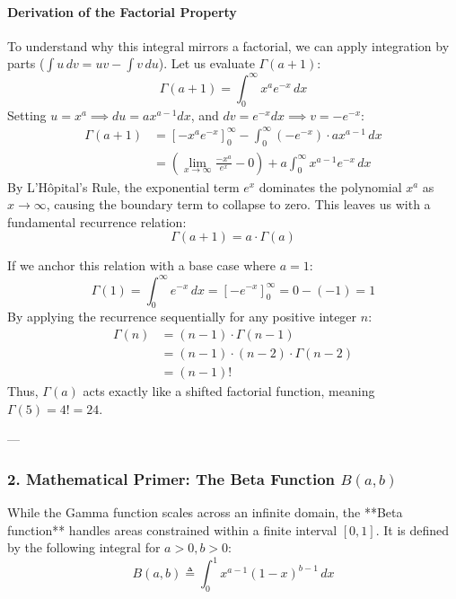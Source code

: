 \documentclass{article}
\begin{document}
\paragraph{Derivation of the Factorial Property}
To understand why this integral mirrors a factorial, we can apply integration by parts ($\int u \, dv = uv - \int v \, du$). Let us evaluate $\Gamma(a+1)$:
\begin{equation*}
\Gamma(a+1) = \int_{0}^{\infty} x^{a} e^{-x} \, dx
\end{equation*}
Setting $u = x^a \implies du = a x^{a-1} dx$, and $dv = e^{-x} dx \implies v = -e^{-x}$:
\begin{align*}
\Gamma(a+1) &= \left[ -x^a e^{-x} \right]_{0}^{\infty} - \int_{0}^{\infty} \left( -e^{-x} \right) \cdot a x^{a-1} \, dx \\
&= \left( \lim_{x \to \infty} \frac{-x^a}{e^x} - 0 \right) + a \int_{0}^{\infty} x^{a-1} e^{-x} \, dx
\end{align*}
By L'Hôpital's Rule, the exponential term $e^x$ dominates the polynomial $x^a$ as $x \to \infty$, causing the boundary term to collapse to zero. This leaves us with a fundamental recurrence relation:
\begin{equation*}
\Gamma(a+1) = a \cdot \Gamma(a)
\end{equation*}

If we anchor this relation with a base case where $a=1$:
\begin{equation*}
\Gamma(1) = \int_{0}^{\infty} e^{-x} \, dx = \left[ -e^{-x} \right]_{0}^{\infty} = 0 - (-1) = 1
\end{equation*}
By applying the recurrence sequentially for any positive integer $n$:
\begin{align*}
\Gamma(n) &= (n-1) \cdot \Gamma(n-1) \\
&= (n-1) \cdot (n-2) \cdot \Gamma(n-2) \\
&= (n-1)!
\end{align*}
Thus, $\Gamma(a)$ acts exactly like a shifted factorial function, meaning $\Gamma(5) = 4! = 24$.

---

\subsubsection*{2. Mathematical Primer: The Beta Function $B(a, b)$}

While the Gamma function scales across an infinite domain, the **Beta function** handles areas constrained within a finite interval $[0, 1]$. It is defined by the following integral for $a > 0, b > 0$:
\begin{equation*}
B(a, b) \triangleq \int_{0}^{1} x^{a-1} (1-x)^{b-1} \, dx
\end{equation*}
\end{document}

